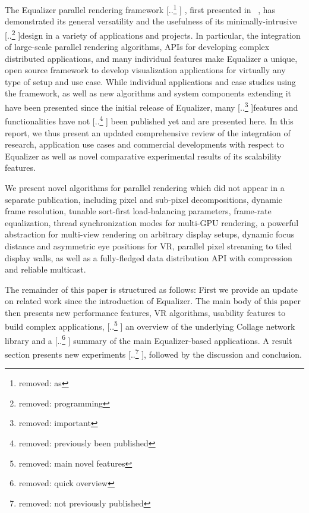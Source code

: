 \documentclass[10pt,journal,compsoc]{IEEEtran}
\providecommand{\DIFaddtex}[1]{{\protect\color{blue} \sf #1}} %
\providecommand{\DIFdeltex}[1]{{\protect\color{red} [..\footnote{removed: #1} ]}} %
\providecommand{\DIFaddbegin}{} %
\providecommand{\DIFaddend}{} %
\providecommand{\DIFdelbegin}{} %
\providecommand{\DIFdelend}{} %
\providecommand{\DIFadd}[1]{\texorpdfstring{\DIFaddtex{#1}}{#1}} %
\providecommand{\DIFdel}[1]{\texorpdfstring{\DIFdeltex{#1}}{}} %
\newcommand{\DIFscaledelfig}{0.5}
\newlength{\DIFdelgraphicswidth} %
\newlength{\DIFdelgraphicsheight} %
\newcommand{\DIFaddincludegraphics}[2][]{{\color{blue}\fbox{\DIFOincludegraphics[#1]{#2}}}} %
\newcommand{\DIFdelincludegraphics}[2][]{%
\sbox{\DIFdelgraphicsbox}{\DIFOincludegraphics[#1]{#2}}%
\settoboxwidth{\DIFdelgraphicswidth}{\DIFdelgraphicsbox} %
\settoboxtotalheight{\DIFdelgraphicsheight}{\DIFdelgraphicsbox} %
\scalebox{\DIFscaledelfig}{%
\parbox[b]{\DIFdelgraphicswidth}{\usebox{\DIFdelgraphicsbox}\\[-\baselineskip] \rule{\DIFdelgraphicswidth}{0em}}\llap{\resizebox{\DIFdelgraphicswidth}{\DIFdelgraphicsheight}{%
\setlength{\unitlength}{\DIFdelgraphicswidth}%
\begin{picture}(1,1)%
\thicklines\linethickness{2pt} %
{\color[rgb]{1,0,0}\put(0,0){\framebox(1,1){}}}%
{\color[rgb]{1,0,0}\put(0,0){\line( 1,1){1}}}%
{\color[rgb]{1,0,0}\put(0,1){\line(1,-1){1}}}%
\end{picture}%
}\hspace*{3pt}}} %
} %
\DeclareRobustCommand{\DIFaddbegin}{\DIFOaddbegin \let\includegraphics\DIFaddincludegraphics} %
\DeclareRobustCommand{\DIFaddend}{\DIFOaddend \let\includegraphics\DIFOincludegraphics} %
\DeclareRobustCommand{\DIFdelbegin}{\DIFOdelbegin \let\includegraphics\DIFdelincludegraphics} %
\DeclareRobustCommand{\DIFdelend}{\DIFOaddend \let\includegraphics\DIFOincludegraphics} %
\begin{document}
The Equalizer parallel rendering framework\DIFdelbegin \DIFdel{as }\DIFdelend \DIFaddbegin \DIFadd{, }\DIFaddend first presented in~\cite{EMP:09}\DIFaddbegin \DIFadd{,
}\DIFaddend has demonstrated its general versatility and the usefulness of its
minimally-intrusive \DIFdelbegin \DIFdel{programming }\DIFdelend design in a variety of applications and projects. In
particular, the integration of large-scale parallel rendering algorithms, APIs
for developing complex distributed applications, and many individual features
make Equalizer a unique, open source framework to develop visualization
applications for virtually any type of setup and use case. While individual
applications and case studies using the framework, as well as new algorithms
and system components extending it have been presented since the initial
release of Equalizer, many \DIFdelbegin \DIFdel{important }\DIFdelend features and functionalities have not \DIFdelbegin \DIFdel{previously been published
}\DIFdelend \DIFaddbegin \DIFadd{been published
yet }\DIFaddend and are presented here. In this report, we thus present an updated
comprehensive review of the integration of research, application use cases and
commercial developments with respect to Equalizer as well as novel comparative
experimental results of its scalability features.

We present novel algorithms for parallel rendering which did not appear in a
separate publication, including pixel and sub-pixel decompositions, dynamic
frame resolution, tunable sort-first load-balancing parameters, frame-rate
equalization, thread synchronization modes for multi-GPU rendering, a powerful
abstraction for multi-view rendering on arbitrary display setups, dynamic focus
distance and asymmetric eye positions for VR, parallel pixel streaming to tiled
display walls, as well as a fully-fledged data distribution API with compression
and reliable multicast.

The remainder of this paper is structured as follows: First we provide an
update on related work since the introduction of \textsf{Equalizer}. The main
body of this paper then presents new performance features, VR algorithms,
usability features to build complex applications, \DIFdelbegin \DIFdel{main novel features }\DIFdelend \DIFaddbegin \DIFadd{an overview }\DIFaddend of the underlying
\textsf{Collage} network library and a \DIFdelbegin \DIFdel{quick overview }\DIFdelend \DIFaddbegin \DIFadd{summary }\DIFaddend of the main
\textsf{Equalizer}-based applications. A result section presents new
experiments\DIFdelbegin \DIFdel{not previously published}\DIFdelend , followed by the discussion and conclusion.
\end{document}
